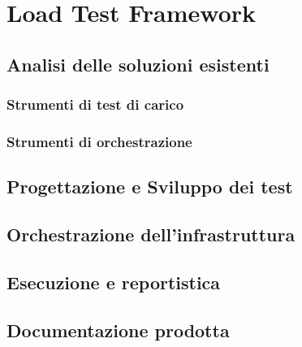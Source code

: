 
\chapter{Load Test Framework}
\label{cap:descrizione-stage}
\section{Analisi delle soluzioni esistenti}
\subsection{Strumenti di test di carico}
\subsection{Strumenti di orchestrazione	}
\section{Progettazione e Sviluppo dei test}
\section{Orchestrazione dell'infrastruttura}
\section{Esecuzione e reportistica}
\section{Documentazione prodotta}